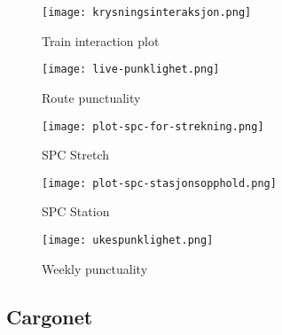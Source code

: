 
\begin{figure}[!htbp]
	\texttt{[image: krysningsinteraksjon.png]}
	\caption[Train interaction plot]{Train interaction plot \cite{sintefPresis}}
	\label{fig:krysningsinteraksjon}
\end{figure}

\begin{figure}[!htbp]
	\texttt{[image: live-punklighet.png]}
	\caption[Route punctuality]{Route punctuality\cite{sintefPresis}}
	\label{fig:live-punklighet}
\end{figure}

\begin{figure}[!htbp]
	\texttt{[image: plot-spc-for-strekning.png]}
	\caption[SPC Stretch]{SPC Stretch \cite{sintefPresis}}
	\label{fig:plot-spc-for-strekning}
\end{figure}

\begin{figure}[!htbp]
	\texttt{[image: plot-spc-stasjonsopphold.png]}
	\caption[SPC Station]{SPC Station \cite{sintefPresis}}
	\label{fig:plot-spc-for-stasjonsopphold}
\end{figure}

\begin{figure}[!htbp]
	\texttt{[image: ukespunklighet.png]}
	\caption[Weekly punctuality]{Weekly punctuality\cite{sintefPresis}}
	\label{fig:ukespunklighet}
\end{figure}

\subsection{Cargonet} %
\label{sub:subsection_cargonet}

